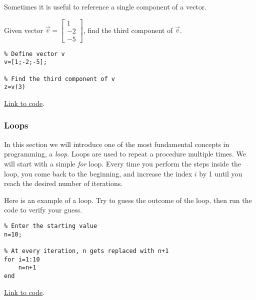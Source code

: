 \documentclass{ximera}
\begin{document}
Sometimes it is useful to reference a single component of a vector.

\begin{example}\label{ex_oct_vec_component}
    Given vector $\vec{v}=\begin{bmatrix}1\\-2\\-5\end{bmatrix}$, find the third component of $\vec{v}$.

\begin{explanation}    
\begin{verbatim}
% Define vector v
v=[1;-2;-5];

% Find the third component of v
z=v(3)
\end{verbatim}

    \href{https://sagecell.sagemath.org/?z=eJxTVXBJTcvMS1UoS00uyS9SKOPlKrONNrTWNbLWNY215uXi5VJVcMvMS1EoyUgF4syiFIXk_NyC_LzUvBKF_DSQhirbMg1jTQAoTxXV&lang=octave&interacts=eJyLjgUAARUAuQ==}{Link to code}.
\end{explanation}    
\end{example}

\subsubsection*{Loops}
In this section we will introduce one of the most fundamental concepts in programming, a \emph{loop}.  Loops are used to repeat a procedure multiple times.  We will start with a simple \emph{for} loop.  Every time you perform the steps inside the loop, you come back to the beginning, and increase the index $i$ by 1 until you reach the desired number of iterations.  

\begin{example}\label{ex:loop1}
Here is an example of a loop.  Try to guess the outcome of the loop, then run the code to verify your guess.

        \begin{verbatim}
% Enter the starting value
n=10;

% At every iteration, n gets replaced with n+1
for i=1:10
    n=n+1
end
    \end{verbatim}

\href{https://sagecell.sagemath.org/?z=eJwdyjEOglAQRdF-ktnDa6iw4LeSX1i4kB95wiRkMMOIcfcSb3lyO9w9GciF2LNFms842vqmitcyjCoqHW4JHowv7Jxb2uYXOGbmjuBrbQ9O-Fgu8L6oPLeA1XItgwrOvP6ZPv0AoF8hKw==&lang=octave&interacts=eJyLjgUAARUAuQ==}{Link to code}.    
\end{example}
\end{document}
